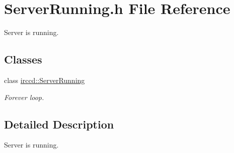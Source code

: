 \hypertarget{a00133}{\section{Server\-Running.\-h File Reference}
\label{a00133}
}


Server is running.  


\subsection*{Classes}
\begin{DoxyCompactItemize}
\item 
class \hyperlink{a00059}{irccd\-::\-Server\-Running}
\begin{DoxyCompactList}\small\item\em Forever loop. \end{DoxyCompactList}\end{DoxyCompactItemize}


\subsection{Detailed Description}
Server is running. 